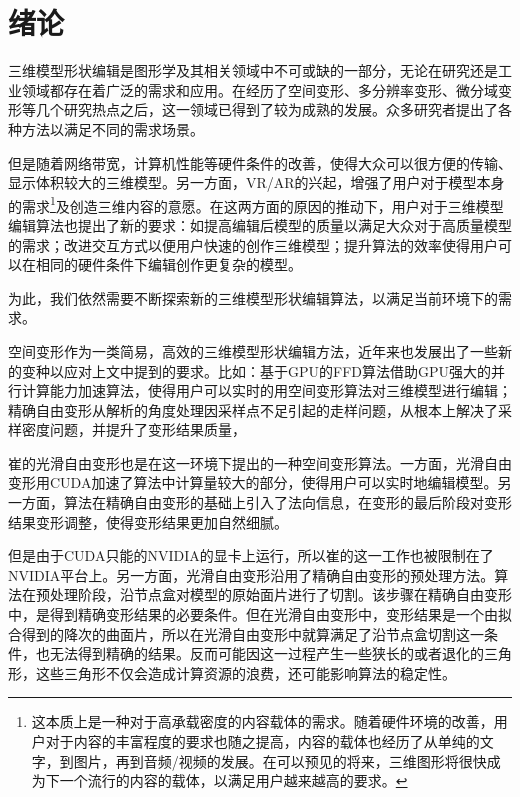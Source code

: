 
\chapter{绪论}

    三维模型形状编辑是图形学及其相关领域中不可或缺的一部分，无论在研究还是工业领域都存在着广泛的需求和应用。在经历了空间变形、多分辨率变形、微分域变形等几个研究热点之后，这一领域已得到了较为成熟的发展。众多研究者提出了各种方法以满足不同的需求场景。

    但是随着网络带宽，计算机性能等硬件条件的改善，使得大众可以很方便的传输、显示体积较大的三维模型。另一方面，VR/AR的兴起，增强了用户对于模型本身的需求\footnote{这本质上是一种对于高承载密度的内容载体的需求。随着硬件环境的改善，用户对于内容的丰富程度的要求也随之提高，内容的载体也经历了从单纯的文字，到图片，再到音频/视频的发展。在可以预见的将来，三维图形将很快成为下一个流行的内容的载体，以满足用户越来越高的要求。}及创造三维内容的意愿。在这两方面的原因的推动下，用户对于三维模型编辑算法也提出了新的要求：如提高编辑后模型的质量以满足大众对于高质量模型的需求；改进交互方式以便用户快速的创作三维模型；提升算法的效率使得用户可以在相同的硬件条件下编辑创作更复杂的模型。

    为此，我们依然需要不断探索新的三维模型形状编辑算法，以满足当前环境下的需求。

    空间变形作为一类简易，高效的三维模型形状编辑方法，近年来也发展出了一些新的变种以应对上文中提到的要求。比如：基于GPU的FFD算法\cite{chua2000, modat2010}借助GPU强大的并行计算能力加速算法，使得用户可以实时的用空间变形算法对三维模型进行编辑；精确自由变形\cite{Feng98, Feng00}从解析的角度处理因采样点不足引起的走样问题，从根本上解决了采样密度问题，并提升了变形结果质量，

    崔的光滑自由变形\cite{Cui15}也是在这一环境下提出的一种空间变形算法。一方面，光滑自由变形用CUDA加速了算法中计算量较大的部分，使得用户可以实时地编辑模型。另一方面，算法在精确自由变形的基础上引入了法向信息，在变形的最后阶段对变形结果变形调整，使得变形结果更加自然细腻。

    但是由于CUDA只能的NVIDIA的显卡上运行，所以崔的这一工作也被限制在了NVIDIA平台上。另一方面，光滑自由变形沿用了精确自由变形\cite{Feng98, Feng00}的预处理方法。算法在预处理阶段，沿节点盒对模型的原始面片进行了切割。该步骤在精确自由变形中，是得到精确变形结果的必要条件。但在光滑自由变形中，变形结果是一个由拟合得到的降次的曲面片，所以在光滑自由变形中就算满足了沿节点盒切割这一条件，也无法得到精确的结果。反而可能因这一过程产生一些狭长的或者退化的三角形，这些三角形不仅会造成计算资源的浪费，还可能影响算法的稳定性。

